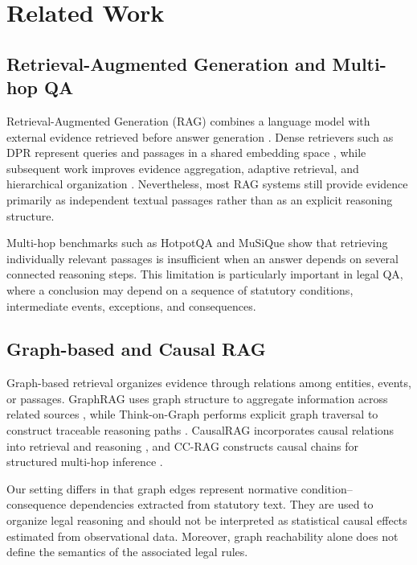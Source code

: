 \section{Related Work}
\label{sec:related_work}

\subsection{Retrieval-Augmented Generation and Multi-hop QA}

Retrieval-Augmented Generation (RAG) combines a language model with external
evidence retrieved before answer generation
\cite{lewis2020retrieval,gao2024ragsurvey}. Dense retrievers such as DPR
represent queries and passages in a shared embedding space
\cite{karpukhin2020dense}, while subsequent work improves evidence aggregation,
adaptive retrieval, and hierarchical organization
\cite{izacard2021fid,asai2024selfrag,sarthi2024raptor}. Nevertheless, most RAG
systems still provide evidence primarily as independent textual passages rather
than as an explicit reasoning structure.

Multi-hop benchmarks such as HotpotQA \cite{yang2018hotpotqa} and MuSiQue
\cite{trivedi2022musique} show that retrieving individually relevant passages
is insufficient when an answer depends on several connected reasoning steps.
This limitation is particularly important in legal QA, where a conclusion may
depend on a sequence of statutory conditions, intermediate events, exceptions,
and consequences.

\subsection{Graph-based and Causal RAG}

Graph-based retrieval organizes evidence through relations among entities,
events, or passages. GraphRAG uses graph structure to aggregate information
across related sources \cite{edge2024graphrag}, while Think-on-Graph performs
explicit graph traversal to construct traceable reasoning paths
\cite{sun2024thinkongraph}. CausalRAG incorporates causal relations into
retrieval and reasoning \cite{wang2025causalrag}, and CC-RAG constructs causal
chains for structured multi-hop inference \cite{parekh2025ccrag}.

Our setting differs in that graph edges represent normative
condition--consequence dependencies extracted from statutory text. They are
used to organize legal reasoning and should not be interpreted as statistical
causal effects estimated from observational data. Moreover, graph reachability
alone does not define the semantics of the associated legal rules.

